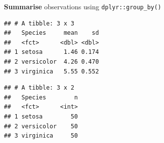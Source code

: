 \documentclass[14pt,ignorenonframetext,]{bredelebeamer}
\newenvironment{Shaded}{\begin{snugshade}}{\end{snugshade}}
\newcommand{\KeywordTok}[1]{\textcolor[rgb]{0.94,0.87,0.69}{#1}}
\newcommand{\DataTypeTok}[1]{\textcolor[rgb]{0.87,0.87,0.75}{#1}}
\newcommand{\StringTok}[1]{\textcolor[rgb]{0.80,0.58,0.58}{#1}}
\newcommand{\OperatorTok}[1]{\textcolor[rgb]{0.94,0.94,0.82}{#1}}
\newcommand{\NormalTok}[1]{\textcolor[rgb]{0.80,0.80,0.80}{#1}}
\begin{document}
\begin{frame}[fragile]{\textbf{Summarise} observations using
\texttt{dplyr::group\_by()}}

\begin{Shaded}
\end{Shaded}

\begin{verbatim}
## # A tibble: 3 x 3
##   Species     mean    sd
##   <fct>      <dbl> <dbl>
## 1 setosa      1.46 0.174
## 2 versicolor  4.26 0.470
## 3 virginica   5.55 0.552
\end{verbatim}

\begin{Shaded}
\end{Shaded}

\begin{verbatim}
## # A tibble: 3 x 2
##   Species        n
##   <fct>      <int>
## 1 setosa        50
## 2 versicolor    50
## 3 virginica     50
\end{verbatim}

\begin{Shaded}
\end{Shaded}

\end{frame}
\end{document}
